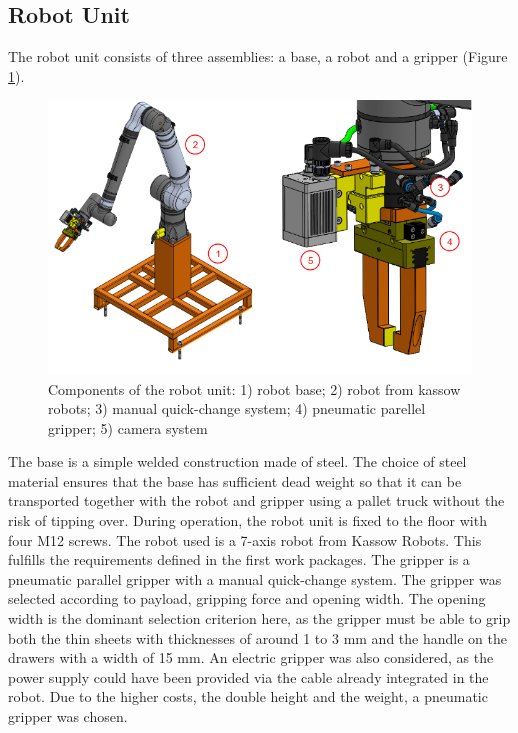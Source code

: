 
\subsection{Robot Unit}

The robot unit consists of three assemblies: a base, a robot and a gripper (Figure \ref{fig:kr1410}).

\begin{figure}[h]
    \centering
    \includegraphics[width=\textwidth]{4. Hardware Integration/4.1 Installation and Configuration/kr1410.png}
    \caption{Components of the robot unit: 1) robot base; 2) robot from kassow robots; 3) manual quick-change system; 4) pneumatic parellel gripper; 5) camera system}
    \label{fig:kr1410}
\end{figure}

The base is a simple welded construction made of steel. The choice of steel material ensures that the base has
sufficient dead weight so that it can be transported together with the robot and gripper using a pallet
truck without the risk of tipping over. During operation, the robot unit is fixed to the floor with four M12
screws. The robot used is a 7-axis robot from Kassow Robots. This fulfills the requirements defined in
the first work packages. The gripper is a pneumatic parallel gripper with a manual quick-change
system. The gripper was selected according to payload, gripping force and opening width. The
opening width is the dominant selection criterion here, as the gripper must be able to grip both the thin
sheets with thicknesses of around 1 to 3 mm and the handle on the drawers with a width of 15 mm. An
electric gripper was also considered, as the power supply could have been provided via the cable
already integrated in the robot. Due to the higher costs, the double height and the weight, a pneumatic
gripper was chosen.



